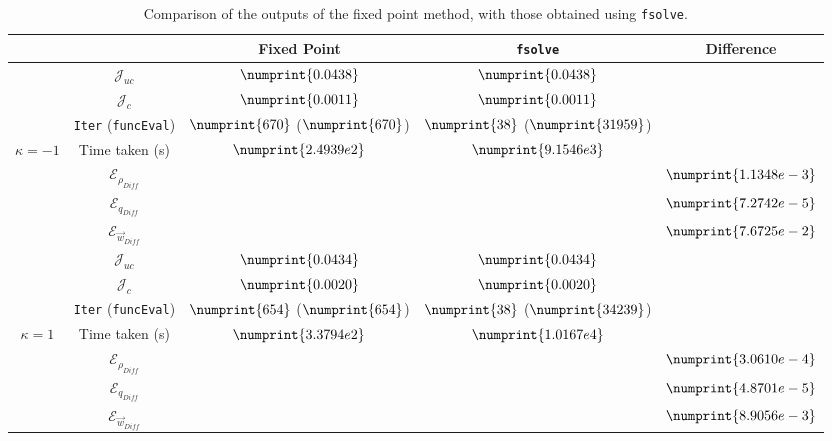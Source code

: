 \documentclass[11pt, a4paper]{article}
\theoremstyle{definition}
\newcommand{\adj}{q}
\begin{document}
\begin{table}
	\begin{tabular}{ | c | c || c | c | c ||}
		\hline
		\multicolumn{2}{|c||}{} & Fixed Point & \texttt{fsolve} & Difference   \\
		\hline
		\hline
		& $\mathcal{J}_{uc}$ & $\numprint{0.0438}$ & $\numprint{0.0438}$ &   \\
		& $\mathcal{J}_{c}$ & $\numprint{0.0011}$ & $\numprint{0.0011}$ &   \\
		& \texttt{Iter} (\texttt{funcEval}) & $\numprint{670}$ ($\numprint{670}$)  & $\numprint{38}$ ($\numprint{31959}$)  &   \\
		$\kappa =-1$ & Time taken (s) & $\numprint{2.4939e2}$ & $\numprint{9.1546e3}$ &   \\
		& $\mathcal{E}_{\rho_{Diff}}$ & & &$\numprint{1.1348e-3}$  \\
		& $\mathcal{E}_{\adj_{Diff}}$ & & &$\numprint{7.2742e-5}$  \\
		& $\mathcal{E}_{\vec{w}_{Diff}}$ & & & $\numprint{7.6725e-2}$  \\
		\hline
		& $\mathcal{J}_{uc}$ & $\numprint{0.0434}$ & $\numprint{0.0434}$ &   \\
		& $\mathcal{J}_{c}$ & $\numprint{0.0020}$ & $\numprint{0.0020}$ &   \\
		& \texttt{Iter} (\texttt{funcEval}) & $\numprint{654}$ ($\numprint{654}$)  & $\numprint{38}$ ($\numprint{34239}$)  &   \\
		$\kappa =1$ & Time taken (s) & $\numprint{3.3794e2}$ & $\numprint{1.0167e4}$ &   \\
		& $\mathcal{E}_{\rho_{Diff}}$ & & &$\numprint{3.0610e-4}$  \\
		& $\mathcal{E}_{\adj_{Diff}}$ & & &$\numprint{4.8701e-5}$  \\
		& $\mathcal{E}_{\vec{w}_{Diff}}$ & & & $\numprint{8.9056e-3}$  \\
		\hline
	\end{tabular}
	\caption{Comparison of the outputs of the fixed point method, with those obtained using \texttt{fsolve}.}
	\label{TabA3:Probd1}
\end{table}
\end{document}
